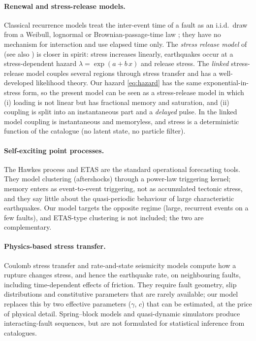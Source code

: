 \documentclass[11pt,a4paper]{article}
\begin{document}
\paragraph{Renewal and stress-release models.}
Classical recurrence models treat the inter-event time of a fault as an i.i.d.\ draw from a Weibull, lognormal or Brownian-passage-time law \citep{Matthews2002}; they have no mechanism for interaction and use elapsed time only. The \emph{stress release model} of \citet{VereJones1978} (see also \citealp{ZhengVereJones1991}) is closer in spirit: stress increases linearly, earthquakes occur at a stress-dependent hazard $\lambda=\exp(a+b\,x)$ and release stress. The \emph{linked} stress-release model couples several regions through stress transfer \citep{LuVereJones2000,Bebbington2003} and has a well-developed likelihood theory. Our hazard \eqref{eq:hazard} has the same exponential-in-stress form, so the present model can be seen as a stress-release model in which (i) loading is not linear but has fractional memory and saturation, and (ii) coupling is split into an instantaneous part and a \emph{delayed} pulse. In the linked model coupling is instantaneous and memoryless, and stress is a deterministic function of the catalogue (no latent state, no particle filter).

\paragraph{Self-exciting point processes.}
The Hawkes process and ETAS \citep{Hawkes1971,Ogata1988} are the standard operational forecasting tools. They model clustering (aftershocks) through a power-law triggering kernel; memory enters as event-to-event triggering, not as accumulated tectonic stress, and they say little about the quasi-periodic behaviour of large characteristic earthquakes. Our model targets the opposite regime (large, recurrent events on a few faults), and ETAS-type clustering is not included; the two are complementary.

\paragraph{Physics-based stress transfer.}
Coulomb stress transfer \citep{Stein1999} and rate-and-state seismicity models \citep{Dieterich1994} compute how a rupture changes stress, and hence the earthquake rate, on neighbouring faults, including time-dependent effects of friction. They require fault geometry, slip distributions and constitutive parameters that are rarely available; our model replaces this by two effective parameters ($\gamma$, $c$) that can be estimated, at the price of physical detail. Spring--block models \citep{BurridgeKnopoff1967} and quasi-dynamic simulators produce interacting-fault sequences, but are not formulated for statistical inference from catalogues.
\end{document}
